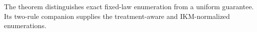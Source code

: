The theorem distinguishes exact fixed-law enumeration from a uniform guarantee. Its two-rule companion supplies the treatment-aware and IKM-normalized enumerations.